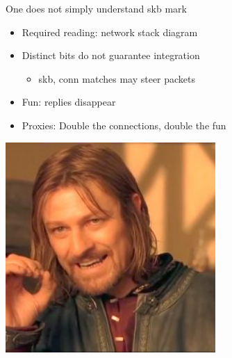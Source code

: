 \documentclass[black,white,aspectratio=169]{beamer}
\DeclareRobustCommand{\#}{\adjustbox{valign=B,totalheight=.57\baselineskip}{\oldhash}}%
\begin{document}
    \begin{frame}{One does not simply understand skb mark}

        \vfill
        \begin{table}
            \begin{subtable}[l]{0.7\textwidth}
                \begin{itemize}
                    \item Required reading: network stack diagram~\medskip
                    \item Distinct bits do not guarantee integration~\smallskip
                    \begin{itemize}
                        \item skb, conn matches may steer packets~\medskip
                    \end{itemize}
                     \item Fun: replies disappear~\medskip
                     \item Proxies: Double the connections, double the fun~\medskip
                \end{itemize}
            \end{subtable}
            \begin{subtable}[r]{0.25\textwidth}
                \includegraphics[width=0.6\textwidth]{boromir.jpg}
            \end{subtable}
        \end{table}
        \vfill
    \end{frame}
\end{document}
